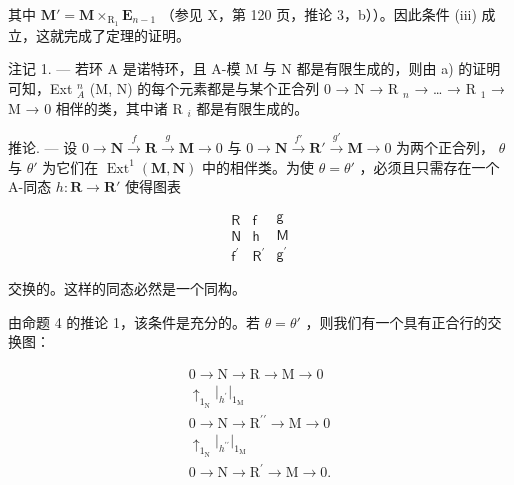 其中 \(\mathbf{M}' = \mathbf{M} \times_{\mathrm{R}_{1}} \mathbf{E}_{n-1}\) （参见 X，第 120 页，推论 3，b））。因此条件 (iii) 成立，这就完成了定理的证明。

注记 1. --- 若环 A 是诺特环，且 A-模 M 与 N 都是有限生成的，则由 a) 的证明可知，Ext \(_{A}^{n}\) (M, N) 的每个元素都是与某个正合列 0 → N → R \(_{n}\) → \ldots{} → R \(_{1}\) → M → 0 相伴的类，其中诸 R \(_{i}\) 都是有限生成的。

推论. --- 设 \(0 \to \mathbf{N} \xrightarrow{f} \mathbf{R} \xrightarrow{g} \mathbf{M} \to 0\) 与 \(0 \to \mathbf{N} \xrightarrow{f'} \mathbf{R}' \xrightarrow{g'} \mathbf{M} \to 0\) 为两个正合列， \(\theta\) 与 \(\theta'\) 为它们在 \(\operatorname{Ext}^1(\mathbf{M}, \mathbf{N})\) 中的相伴类。为使 \(\theta = \theta'\) ，必须且只需存在一个 A-同态 \(h: \mathbf{R} \to \mathbf{R}'\) 使得图表

\[
\begin{array}{c} \mathsf {R} \\ \mathsf {N} \\ \mathsf {f ^ {\prime}} \end{array} \begin{array}{c} \mathsf {f} \\ \mathsf {h} \\ \mathsf {R ^ {\prime}} \end{array} \begin{array}{c} \mathsf {g} \\ \mathsf {M} \\ \mathsf {g ^ {\prime}} \end{array}
\]

交换的。这样的同态必然是一个同构。

由命题 4 的推论 1，该条件是充分的。若 \(\theta = \theta'\) ，则我们有一个具有正合行的交换图：

\[
\begin{array}{c} 0 \longrightarrow \mathrm{N} \longrightarrow \mathrm{R} \longrightarrow \mathrm{M} \longrightarrow 0 \\ \uparrow_ {1 _ {\mathrm{N}}} \Big | _ {h ^ {\prime}} \Big | _ {1 _ {\mathrm{M}}} \\ 0 \longrightarrow \mathrm{N} \longrightarrow \mathrm{R} ^ {\prime \prime} \longrightarrow \mathrm{M} \longrightarrow 0 \\ \uparrow_ {1 _ {\mathrm{N}}} \Big | _ {h ^ {\prime \prime}} \Big | _ {1 _ {\mathrm{M}}} \\ 0 \longrightarrow \mathrm{N} \longrightarrow \mathrm{R} ^ {\prime} \longrightarrow \mathrm{M} \longrightarrow 0. \end{array}
\]

